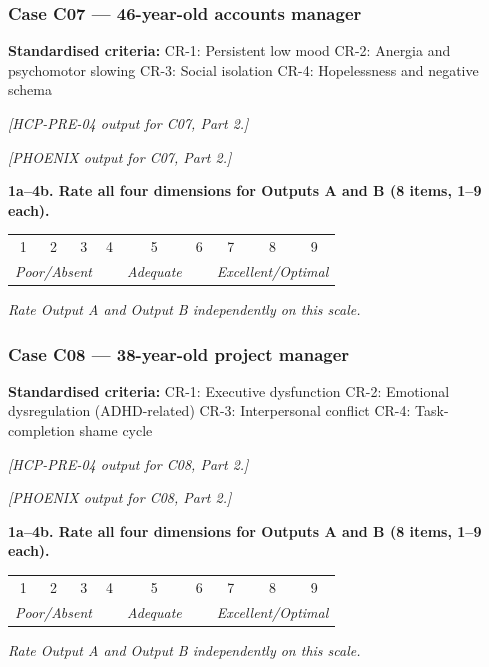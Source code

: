 \documentclass[11pt,a4paper]{article}
\makeatletter
\newcommand{\likertscale}[1]{%
\par\vspace{0.15em}%
\noindent\begin{tcolorbox}[colback=ScaleBG,colframe=BorderGrey,boxrule=0.4pt,arc=1mm,left=5pt,right=5pt,top=4pt,bottom=4pt]%
\small\textbf{\color{SlateMid}#1}\\[0.25em]%
\begin{tabular}{@{}*{9}{c}@{}}%
1 & 2 & 3 & 4 & 5 & 6 & 7 & 8 & 9 \\%
\multicolumn{3}{l}{\tiny\itshape Poor/Absent} & & \multicolumn{1}{c}{\tiny\itshape Adequate} & & \multicolumn{3}{r}{\tiny\itshape Excellent/Optimal}%
\end{tabular}%
\quad\textit{Rate Output A and Output B independently on this scale.}%
\end{tcolorbox}\vspace{0.1em}}
\makeatother
\begin{document}
\subsubsection*{Case C07 --- 46-year-old accounts manager}
\begin{vignettebox}
\small\textbf{Standardised criteria:} CR-1: Persistent low mood \quad CR-2: Anergia and psychomotor slowing \quad CR-3: Social isolation \quad CR-4: Hopelessness and negative schema
\end{vignettebox}
\begin{outputAbox}\small\textit{[HCP-PRE-04 output for C07, Part 2.]}\end{outputAbox}
\begin{outputBbox}\small\textit{[PHOENIX output for C07, Part 2.]}\end{outputBbox}
\begin{ratingbox}
\likertscale{1a--4b. Rate all four dimensions for Outputs A and B (8 items, 1--9 each).}
\end{ratingbox}

\vspace{0.4em}

\subsubsection*{Case C08 --- 38-year-old project manager}
\begin{vignettebox}
\small\textbf{Standardised criteria:} CR-1: Executive dysfunction \quad CR-2: Emotional dysregulation (ADHD-related) \quad CR-3: Interpersonal conflict \quad CR-4: Task-completion shame cycle
\end{vignettebox}
\begin{outputAbox}\small\textit{[HCP-PRE-04 output for C08, Part 2.]}\end{outputAbox}
\begin{outputBbox}\small\textit{[PHOENIX output for C08, Part 2.]}\end{outputBbox}
\begin{ratingbox}
\likertscale{1a--4b. Rate all four dimensions for Outputs A and B (8 items, 1--9 each).}
\end{ratingbox}

\vspace{0.4em}
\end{document}

